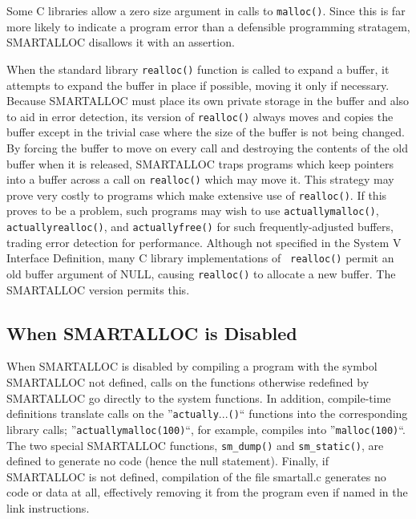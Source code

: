 Some C libraries allow a zero size argument in calls to {\tt malloc()}. Since
this is far more likely to indicate a program error than a defensible
programming stratagem, SMARTALLOC disallows it with an assertion.

When the standard library {\tt realloc()} function is called to expand a
buffer, it attempts to expand the buffer in place if possible, moving it only
if necessary. Because SMARTALLOC must place its own private storage in the
buffer and also to aid in error detection, its version of {\tt realloc()}
always moves and copies the buffer except in the trivial case where the size
of the buffer is not being changed. By forcing the buffer to move on every
call and destroying the contents of the old buffer when it is released,
SMARTALLOC traps programs which keep pointers into a buffer across a call on
{\tt realloc()} which may move it. This strategy may prove very costly to
programs which make extensive use of {\tt realloc()}. If this proves to be a
problem, such programs may wish to use {\tt actuallymalloc()}, {\tt
actuallyrealloc()}, and {\tt actuallyfree()} for such frequently-adjusted
buffers, trading error detection for performance. Although not specified in
the System V Interface Definition, many C library implementations of {\tt
realloc()} permit an old buffer argument of NULL, causing {\tt realloc()} to
allocate a new buffer. The SMARTALLOC version permits this.

\subsection{ When SMARTALLOC is Disabled}

When SMARTALLOC is disabled by compiling a program with the symbol SMARTALLOC
not defined, calls on the functions otherwise redefined by SMARTALLOC go
directly to the system functions. In addition, compile-time definitions
translate calls on the ''{\tt actually}...{\tt ()}`` functions into the
corresponding library calls; ''{\tt actuallymalloc(100)}``, for example,
compiles into ''{\tt malloc(100)}``. The two special SMARTALLOC functions,
{\tt sm\_dump()} and {\tt sm\_static()}, are defined to generate no code
(hence the null statement). Finally, if SMARTALLOC is not defined, compilation
of the file smartall.c generates no code or data at all, effectively removing
it from the program even if named in the link instructions.

